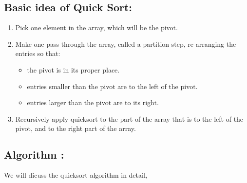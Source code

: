 \documentclass{article}
\begin{document}
	\subsection{Basic idea of Quick Sort:}
	\begin{enumerate}
		\item Pick one element in the array, which will be the pivot. 
		\item Make one pass through the array, called a partition step, re-arranging the entries so that: 
		\begin{itemize}
			\item the pivot is in its proper place. 
			\item entries smaller than the pivot are to the left of the pivot. 
			\item entries larger than the pivot are to its right. 
		\end{itemize}
		\item Recursively apply quicksort to the part of the array that is to the left of the pivot, and to the right part of the array. 
	\end{enumerate}
	
	\subsection{Algorithm : } We will dicuss the quicksort algorithm in detail,
	
\end{document}
